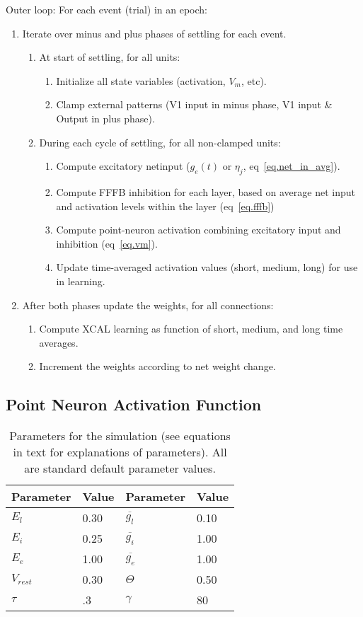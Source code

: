 Outer loop: For each event (trial) in an epoch:
\begin{enumerate}
\item Iterate over minus and plus phases of settling for each event.
 \begin{enumerate}
 \item At start of settling, for all units:
  \begin{enumerate}
  \item Initialize all state variables (activation, $V_m$, etc).
  \item Clamp external patterns (V1 input in minus phase, V1 input \& Output in plus phase).
  \end{enumerate}
 \item During each cycle of settling, for all non-clamped units:
  \begin{enumerate}
  \item Compute excitatory netinput ($g_e(t)$ or $\eta_j$,
   eq~\ref{eq.net_in_avg}).
  \item Compute FFFB inhibition for each layer, based on average net input and activation levels within the layer (eq~\ref{eq.fffb})
  \item Compute point-neuron activation combining excitatory input and inhibition (eq~\ref{eq.vm}).
  \item Update time-averaged activation values (short, medium, long) for use in learning.
  \end{enumerate}
 \end{enumerate}
 \item After both phases update the weights, for all connections:
 \begin{enumerate}
 \item Compute XCAL learning as function of short, medium, and long time averages.
 \item Increment the weights according to net weight change.
 \end{enumerate}
\end{enumerate}

\subsection{Point Neuron Activation Function} 

\begin{table}
 \centering
 \begin{tabular}{ll|ll} \hline
Parameter & Value & Parameter & Value \\ \hline
$E_l$ & 0.30 & $\overline{g_l}$ & 0.10 \\
$E_i$ & 0.25 & $\overline{g_i}$ & 1.00 \\
$E_e$ & 1.00 & $\overline{g_e}$ & 1.00 \\
$V_{rest}$ & 0.30 & $\Theta$  & 0.50 \\
$\tau$ & .3 & $\gamma$ & 80 \\ \hline
 \end{tabular}
 \caption{\small Parameters for the simulation (see equations in text
  for explanations of parameters). All are standard default parameter values.}
 \label{tab.sim_params}
\end{table}


